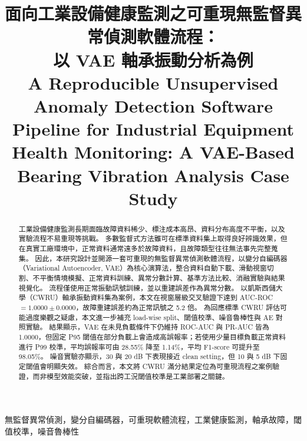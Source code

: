 \documentclass[conference,compsoc]{IEEEtran}
\begin{document}
\title{面向工業設備健康監測之可重現無監督異常偵測軟體流程：\\
以 VAE 軸承振動分析為例\\
\large A Reproducible Unsupervised Anomaly Detection Software Pipeline for Industrial Equipment Health Monitoring: A VAE-Based Bearing Vibration Analysis Case Study}

\author{
}

\maketitle

\begin{abstract}
工業設備健康監測長期面臨故障資料稀少、標注成本高昂、資料分布高度不平衡，以及實驗流程不易重現等挑戰。
多數監督式方法雖可在標準資料集上取得良好辨識效果，但在真實工廠環境中，正常資料通常遠多於故障資料，且故障類型往往無法事先完整蒐集。
因此，本研究設計並開源一套可重現的無監督異常偵測軟體流程，以變分自編碼器（Variational Autoencoder, VAE）為核心演算法，整合資料自動下載、滑動視窗切割、不平衡情境模擬、正常資料訓練、異常分數計算、基準方法比較、消融實驗與結果視覺化。
流程僅使用正常振動訊號訓練，並以重建誤差作為異常分數。
以凱斯西儲大學（CWRU）軸承振動資料集為案例，本文在視窗層級交叉驗證下達到 AUC-ROC $=1.0000\pm0.0000$，故障重建誤差約為正常訊號之 5.2 倍。
為回應標準 CWRU 評估可能過度樂觀之疑慮，本文進一步補充 load-wise split、閾值校準、噪音魯棒性與 AE 對照實驗。
結果顯示，VAE 在未見負載條件下仍維持 ROC-AUC 與 PR-AUC 皆為 1.0000，但固定 P95 閾值在部分負載上會造成高誤報率；若使用少量目標負載正常資料進行 P99 校準，平均誤報率可由 28.55\% 降至 1.14\%，平均 F1-score 可提升至 98.05\%。
噪音實驗亦顯示，30 與 20 dB 下表現接近 clean setting，但 10 與 5 dB 下固定閾值會明顯失效。
綜合而言，本文將 CWRU 滿分結果定位為可重現流程之案例驗證，而非模型效能突破，並指出跨工況閾值校準是工業部署之關鍵。
\end{abstract}

\begin{IEEEkeywords}
無監督異常偵測，變分自編碼器，可重現軟體流程，工業健康監測，軸承故障，閾值校準，噪音魯棒性
\end{IEEEkeywords}
\end{document}
